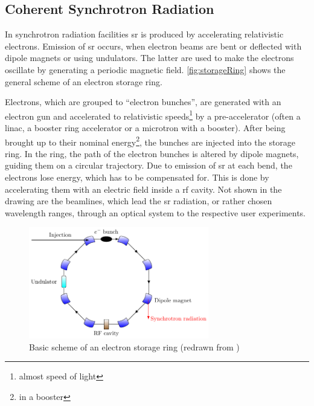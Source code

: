 \subsection{Coherent Synchrotron Radiation}
In synchrotron radiation facilities \gls{sr} is produced by accelerating relativistic electrons.
Emission of \gls{sr} occurs, when electron beams are bent or deflected with dipole magnets or using undulators. The latter are used to make the electrons oscillate by generating a periodic magnetic field.  
\autoref{fig:storageRing} shows the general scheme of an electron storage ring.

Electrons, which are grouped to ``electron bunches'', are generated with an electron gun and accelerated to relativistic speeds\footnote{almost speed of light} by a pre-accelerator (often a \gls{linac}, a booster ring accelerator or a microtron with a booster). %
After being brought up to their nominal energy\footnote{in a booster}, the bunches are injected into the storage ring.
In the ring, the path of the electron bunches is altered by dipole magnets, guiding them on a circular trajectory. %
Due to emission of \gls{sr} at each bend, the electrons lose energy, which has to be compensated for.
This is done by accelerating them with an electric field inside a \gls{rf} cavity.
Not shown in the drawing are the beamlines, which lead the \gls{sr} radiation, or rather chosen wavelength ranges, through an optical system to the respective user experiments. \cite{roussel2014,rota2018}

\begin{figure}[tbh]
	\centering
	\includegraphics[width=0.7\textwidth]{chap/02-theory/img/synchrotron.pdf}
	\caption{Basic scheme of an electron storage ring (redrawn from \cite{roussel2014})}
	\label{fig:storageRing}
\end{figure}

